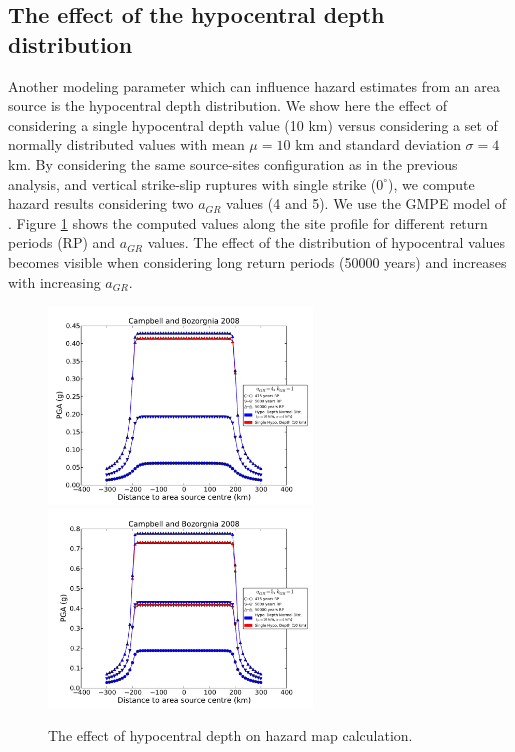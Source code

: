 \subsection{The effect of the hypocentral depth distribution}
Another modeling parameter which can influence hazard estimates from an area
source is the hypocentral depth distribution. We show here the effect of
considering a single hypocentral depth value (10 km) versus considering a set of
normally distributed values with mean $\mu=10$ km and standard deviation
$\sigma=4$ km. By considering the same source-sites configuration as in the
previous analysis, and vertical strike-slip ruptures with single strike
($0^{\circ}$), we compute hazard results considering two $a_{GR}$ values (4 and
5).  We use the GMPE model of \citet{campbell2008}. Figure
\ref{fig:hypo_depth_area} shows the computed values along the site profile for
different return periods (RP) and $a_{GR}$ values. The effect of the
distribution of hypocentral values becomes visible when considering long return
periods (50000 years) and increases with increasing $a_{GR}$.
%
\begin{figure}
\centering
\includegraphics[width=7cm]{./Pictures/PGA_a4_CB2008_hypo_depth.pdf}
\includegraphics[width=7cm]{./Pictures/PGA_a5_CB2008_hypo_depth.pdf}
\caption{The effect of hypocentral depth on hazard map calculation.}
\label{fig:hypo_depth_area}
\end{figure}
%
%
